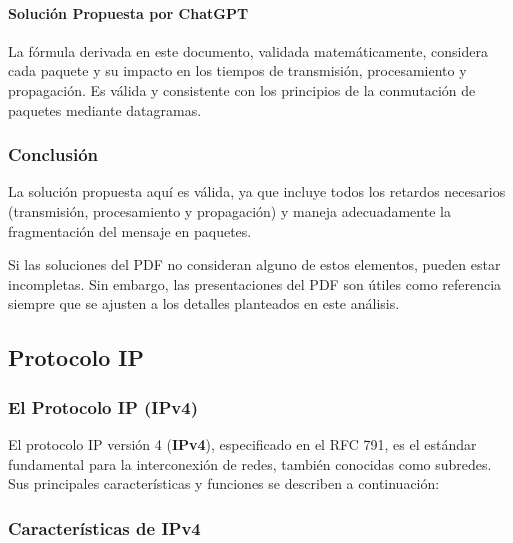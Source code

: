 \documentclass[a4paper,12pt]{article}
\begin{document}
\paragraph{Solución Propuesta por ChatGPT}
La fórmula derivada en este documento, validada matemáticamente, considera cada paquete y su impacto en los tiempos de transmisión, procesamiento y propagación. Es válida y consistente con los principios de la conmutación de paquetes mediante datagramas.

\subsubsection*{Conclusión}

La solución propuesta aquí es válida, ya que incluye todos los retardos necesarios (transmisión, procesamiento y propagación) y maneja adecuadamente la fragmentación del mensaje en paquetes. 

Si las soluciones del PDF no consideran alguno de estos elementos, pueden estar incompletas. Sin embargo, las presentaciones del PDF son útiles como referencia siempre que se ajusten a los detalles planteados en este análisis.


\subsection{Protocolo IP}

\subsubsection{El Protocolo IP (IPv4)}

El protocolo IP versión 4 (\textbf{IPv4}), especificado en el RFC 791, es el estándar fundamental para la interconexión de redes, también conocidas como subredes. Sus principales características y funciones se describen a continuación:

\subsubsection*{Características de IPv4}
\end{document}
